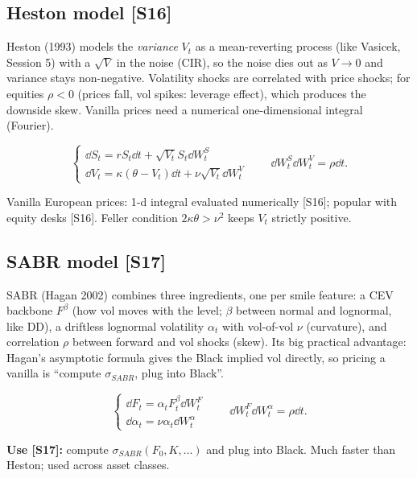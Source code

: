 \documentclass[10pt]{article}
\begin{document}
\subsection{Heston model [S16]}
\begin{idea}
Heston (1993) models the \emph{variance} $V_t$ as a mean-reverting process (like Vasicek, Session 5) with a $\sqrt V$ in the noise (CIR), so the noise dies out as $V\to0$ and variance stays non-negative. Volatility shocks are correlated with price shocks; for equities $\rho<0$ (prices fall, vol spikes: leverage effect), which produces the downside skew. Vanilla prices need a numerical one-dimensional integral (Fourier).
\end{idea}
\[\begin{cases}\dd S_t=rS_t\dd t+\sqrt{V_t}S_t\dd W^S_t\\ \dd V_t=\kappa(\theta-V_t)\dd t+\nu\sqrt{V_t}\dd W^V_t\end{cases}\qquad\dd W^S_t\dd W^V_t=\rho\dd t.\]
\begin{where}
\end{where}
Vanilla European prices: 1-d integral evaluated numerically [S16]; popular with equity desks [S16]. \beyond{} Feller condition $2\kappa\theta>\nu^2$ keeps $V_t$ strictly positive.

\subsection{SABR model [S17]}
\begin{idea}
SABR (Hagan 2002) combines three ingredients, one per smile feature: a CEV backbone $F^\beta$ (how vol moves with the level; $\beta$ between normal and lognormal, like DD), a driftless lognormal volatility $\alpha_t$ with vol-of-vol $\nu$ (curvature), and correlation $\rho$ between forward and vol shocks (skew). Its big practical advantage: Hagan's asymptotic formula gives the Black implied vol directly, so pricing a vanilla is ``compute $\sigma_{SABR}$, plug into Black''.
\end{idea}
\[\begin{cases}\dd F_t=\alpha_tF_t^\beta\dd W^F_t\\ \dd\alpha_t=\nu\alpha_t\dd W^\alpha_t\end{cases}\qquad\dd W^F_t\dd W^\alpha_t=\rho\dd t.\]
\begin{where}
\end{where}
\textbf{Use [S17]:} compute $\sigma_{SABR}(F_0,K,\dots)$ and plug into Black. Much faster than Heston; used across asset classes.
\end{document}
